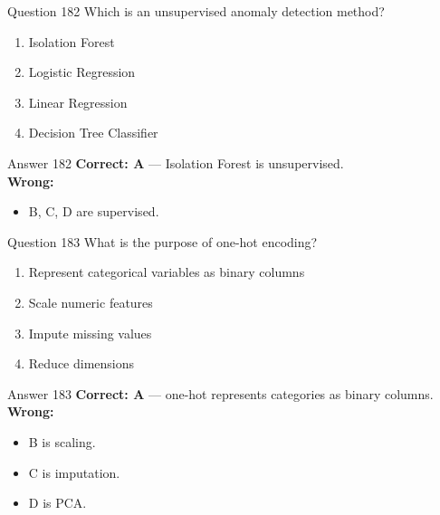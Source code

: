 \documentclass[aspectratio=169,11pt]{beamer}
\begin{document}
	\begin{frame}{Question 182}
		Which is an unsupervised anomaly detection method?
		\begin{enumerate}[label=\Alph*.]
			\item Isolation Forest
			\item Logistic Regression
			\item Linear Regression
			\item Decision Tree Classifier
		\end{enumerate}
	\end{frame}
	\begin{frame}{Answer 182}
		\textbf{Correct: A} --- Isolation Forest is unsupervised.\\
		\vspace{0.5em}
		\textbf{Wrong:}
		\begin{itemize}
			\item B, C, D are supervised.
		\end{itemize}
	\end{frame}
	
	\begin{frame}{Question 183}
		What is the purpose of one-hot encoding?
		\begin{enumerate}[label=\Alph*.]
			\item Represent categorical variables as binary columns
			\item Scale numeric features
			\item Impute missing values
			\item Reduce dimensions
		\end{enumerate}
	\end{frame}
	\begin{frame}{Answer 183}
		\textbf{Correct: A} --- one-hot represents categories as binary columns.\\
		\vspace{0.5em}
		\textbf{Wrong:}
		\begin{itemize}
			\item B is scaling.
			\item C is imputation.
			\item D is PCA.
		\end{itemize}
	\end{frame}
	
\end{document}
